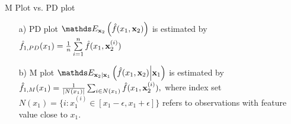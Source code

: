 \documentclass[10pt,compress,t,notes=noshow, xcolor=table]{beamer}
\begin{document}
\begin{frame}{M Plot vs. PD plot}
\begin{enumerate}[<+->]
\item[a)] PD plot $\E_{\xv_2} \left( \fh(x_1, \xv_2) \right)$ is estimated by $ \hat{f}_{1, PD}(x_1) = \frac{1}{n} \sum\limits_{i=1}^n \hat{f}(x_1, \mathbf{x}_2^{(i)})$
\item[b)] M plot $\E_{\xv_2|\xv_1} \left( \fh(x_1, \xv_2) \middle| \xv_1\right)$ is
estimated by $\hat{f}_{1, M}(x_1) = \textstyle\frac{1}{|N(x_1)|} \sum_{i \in N(x_1)} \hat{f}(x_1, \mathbf{x}_2^{(i)}),$
where index set $N(x_1) = \{i: x_1^{(i)} \in [x_1 - \epsilon, x_1 + \epsilon]\}$ refers to observations with feature value close to $x_1$. %
\end{enumerate}
\end{frame}
\end{document}
